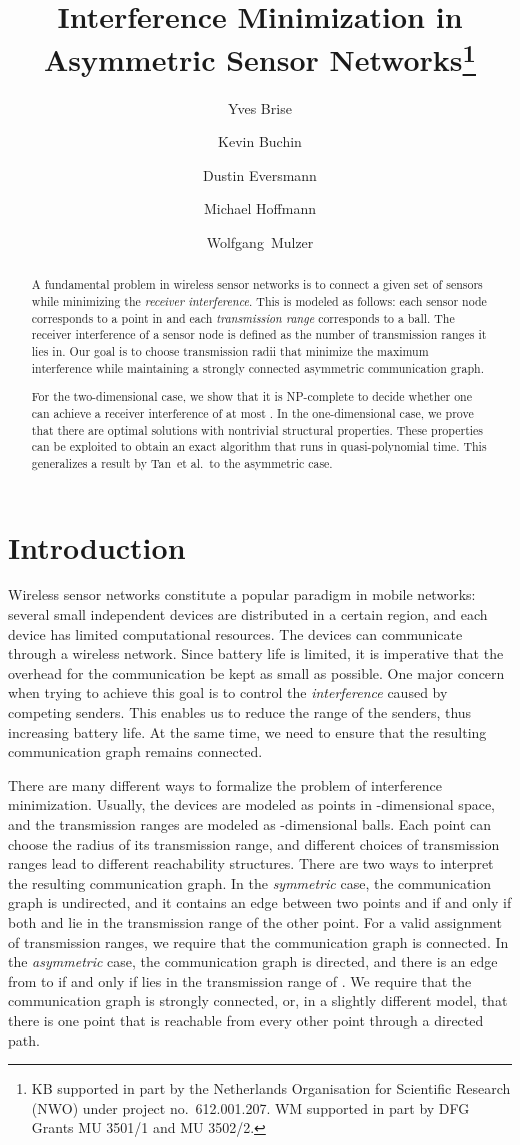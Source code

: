 \documentclass[envcountsect,envcountsame,runningheads,a4paper]{llncs}
\title{Interference Minimization in Asymmetric Sensor Networks\thanks{KB supported in part by the Netherlands Organisation for Scientific 
Research (NWO) under project no.\ 612.001.207.
WM supported in part by DFG Grants MU 3501/1
and MU 3502/2.
}
}
\author{
Yves Brise\inst{1}
\and
Kevin Buchin\inst{2}
\and Dustin Eversmann\inst{3}
\and Michael Hoffmann\inst{1}
\and Wolfgang~Mulzer\inst{3}
}
\institute{
ETH Z\"urich, Switzerland,
{\tt hoffmann@inf.ethz.ch}
\and
TU Eindhoven, The Netherlands,
{\tt k.a.buchin@tue.de}
\and
FU Berlin, Germany,
{\tt mulzer@inf.fu-berlin.de}
}
\begin{document}
\maketitle

\begin{abstract}
A fundamental problem in wireless sensor networks is to connect
a given set of sensors while minimizing the \emph{receiver
interference}.
This is modeled as follows: each sensor node corresponds
to a point in  and each \emph{transmission range} corresponds
to a ball. The receiver interference of a sensor node is
defined as the number of transmission ranges it lies in.
Our goal is to choose transmission radii that
minimize the maximum interference while maintaining a
strongly connected asymmetric communication graph.

For the two-dimensional case, we show that it is NP-complete
to decide whether one can achieve a receiver interference
of at most . In the one-dimensional case, we prove that there are
optimal solutions with nontrivial structural properties. These
properties can be exploited to obtain an
exact algorithm that runs in quasi-polynomial time.
This generalizes a result by Tan~et al.~to the asymmetric case.
\end{abstract}
\section{Introduction}

Wireless sensor networks constitute a popular paradigm in mobile networks:
several small independent devices are distributed in a certain region,
and each device has limited computational resources. The devices
can communicate through a wireless network. Since battery life is limited,
it is imperative that the overhead for the communication be kept as small
as possible.
One major concern when trying to achieve this goal is to control the
\emph{interference} caused by competing senders. This enables us
to reduce the range of the senders, thus increasing
battery life. At the same time, we need to
ensure that the resulting communication graph remains connected.

There are many different ways to formalize the problem of
interference minimization.  Usually, the devices are modeled as
points in -dimensional space, and
the transmission ranges are modeled as -dimensional balls.
Each point can choose the radius of its transmission range, and
different choices of transmission ranges lead to different
reachability structures.
There are two ways to interpret the resulting
communication graph. In the \emph{symmetric} case,
the communication graph is undirected, and it contains an edge between
two points  and  if and only if both  and  lie in the transmission
range of the other point. For a valid
assignment of transmission ranges, we require that
the communication graph is connected.
In the \emph{asymmetric} case, the communication graph is directed,
and there is an edge from  to  if and only if  lies in the
transmission range of . We require that the communication graph
is strongly connected, or, in a slightly different model,
that there is one point that is reachable from
every other point through a directed path.
\end{document}

